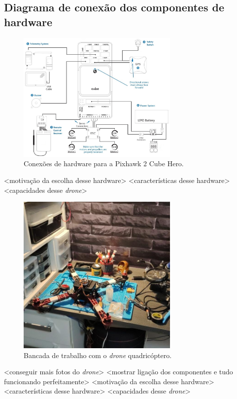 \documentclass[12pt,a4paper,oneside]{book}
\begin{document}
\subsection{Diagrama de conexão dos componentes de hardware}
%
\begin{figure}[!htbp]
  \centering
  \includegraphics[width=0.7\textwidth]{Images/Diagramas/cube_wiring_overview.jpg}
  \caption{Conexões de hardware para a Pixhawk 2 Cube Hero.}
  \label{fig:cube_wiring_overview.jpg.0}
\end{figure}
%
<motivação da escolha desse hardware>
<características desse hardware>
<capacidades desse \textit{drone}>
%
\begin{figure}[!htbp]
  \centering
  \includegraphics[width=0.7\textwidth]{Images/Desenvolvimento/omnibus_drone.jpeg}
  \caption{Bancada de trabalho com o \textit{drone} quadricóptero.}
  \label{fig:omnibus_drone.jpeg.0}
\end{figure}
%
<conseguir mais fotos do \textit{drone}>
<mostrar ligação dos componentes e tudo funcionando perfeitamente>
<motivação da escolha desse hardware>
<características desse hardware>
<capacidades desse \textit{drone}>
\end{document}
